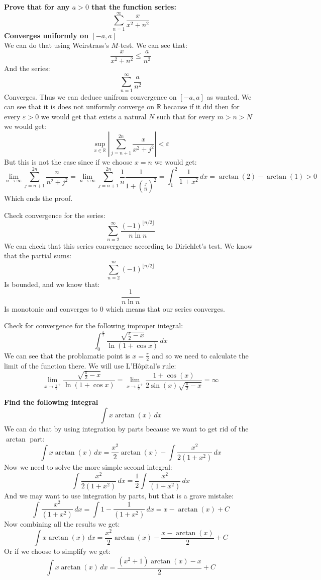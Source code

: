 \documentclass{article}
\theoremstyle{plain}
\newcommand{\R}{\mathbb{R}}
\begin{document}
	\textbf{Prove that for any $a > 0$ that the function series:
	\[
		\sum_{n=1}^{\infty}{\frac{x}{x^2+n^2}}
	\]
	Converges uniformly on $[-a,a]$} \\
	We can do that using Weirstrass's $M$-test. We can see that:
	\[
		\frac{x}{x^2+n^2} \le \frac{a}{n^2}
	\]
	And the series:
	\[
		\sum_{n=1}^{\infty}{\frac{a}{n^2}}
	\]
	Converges. Thus we can deduce unifrom convergence on $[-a,a]$ as wanted.
	We can see that it is does not uniformly converge on $\R$ because
	if it did then for every $\varepsilon > 0$ we would get that exists
	a natural $N$ such that for every $m > n > N$ we would get:
	\[
		\sup_{x\in\R} \left| \sum_{j=n+1}^{2n}{\frac{x}{x^2+j^2}}
		\right| < \varepsilon
	\]
	But this is not the case since if we choose $x=n$ we would get:
	\[
		\lim_{n\to\infty}\sum_{j=n+1}^{2n}{\frac{n}{n^2+j^2}} =
		\lim_{n\to\infty}\sum_{j=n+1}^{2n}
		{\frac{1}{n}\frac{1}{1+(\frac{j}{n})^2}} = 
		\int_1^2{\frac{1}{1+x^2}\,dx} = \arctan(2) - \arctan(1) > 0
	\]
	Which ends the proof.
	
	\newpage
	
	Check convergence for the series:
	\[
		\sum_{n=2}^{\infty} {\frac{(-1)^{\lfloor n/2 \rfloor}}{n\ln n}}
	\]
	We can check that this series convergence according to Dirichlet's
	test. We know that the partial sums:
	\[
		\sum_{n=2}^{m}{(-1)^{\lfloor n/2 \rfloor}}
	\]
	Is bounded, and we know that:
	\[
		{\frac{1}{n\ln n}}
	\]
	Is monotonic and converges to $0$ which means that our series converges.
	
	\newpage
	
	Check for convergence for the following improper integral:
	\[
		\int_{0}^{\frac{\pi}{2}}
		{\frac{\sqrt{\frac{\pi}{2}-x}}{\ln(1+\cos x)}\,dx}
	\]
	We can see that the problamatic point is $x = \frac{\pi}{2}$ and
	so we need to calculate the limit of the function there. We will
	use L'H\^opital's rule:
	\[
		\lim_{x\to\frac{\pi}{2}^+}
		{\frac{\sqrt{\frac{\pi}{2}-x}}{\ln(1+\cos x)}} = 
		\lim_{x\to\frac{\pi}{2}^+}
		\frac{1+\cos(x)}{2\sin(x)\sqrt{\frac{\pi}{2}-x}} = \infty
	\]
	
	
	\newpage
	
	\textbf{Find the following integral}
	\[
		\int{x\arctan(x)\,dx}
	\]
	We can do that by using integration by parts because we want to get rid
	of the $\arctan$ part:
	\[
		\int{x\arctan(x)\,dx} = 
		\frac{x^2}{2}\arctan(x) - 
		\int{\frac{x^2}{2(1+x^2)}\,dx}
	\]
	Now we need to solve the more simple second integral:
	\[
		\int{\frac{x^2}{2(1+x^2)}\,dx} = 
		\frac{1}{2}\int{\frac{x^2}{(1+x^2)}\,dx}
	\]
	And we may want to use integration by parts, but that is a grave mistake:
	\[
		\int{\frac{x^2}{(1+x^2)}\,dx} =
		\int{1 - \frac{1}{(1+x^2)}\,dx} = x - \arctan(x) + C
	\]
	Now combining all the results we get:
	\[
		\int{x\arctan(x)\,dx} = 
		\frac{x^2}{2}\arctan(x) - 
		\frac{x - \arctan(x)}{2} + C
	\]
	Or if we choose to simplify we get:
	\[
		\int{x\arctan(x)\,dx} = 
		\frac{(x^2+1)\arctan(x) - x}{2} + C
	\] 
	
	
	
	
	
	
	
	
	
\end{document}
